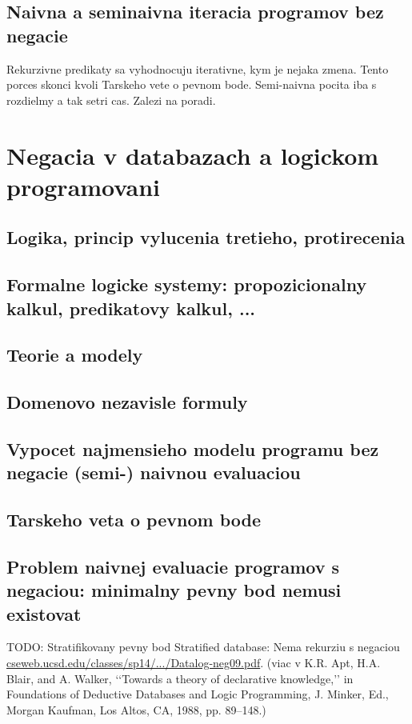 \documentclass[12pt,a4paper]{article}
\begin{document}
\subsection{Naivna a seminaivna iteracia programov bez negacie}
Rekurzivne predikaty sa vyhodnocuju iterativne, kym je nejaka zmena. Tento porces skonci kvoli Tarskeho vete o pevnom bode. Semi-naivna pocita iba s rozdielmy a tak setri cas. Zalezi na poradi. 

\section{Negacia v databazach a logickom programovani}

\subsection{Logika, princip vylucenia tretieho, protirecenia}

\subsection{Formalne logicke systemy: propozicionalny kalkul, predikatovy kalkul, ...}

\subsection{Teorie a modely}

\subsection{Domenovo nezavisle formuly}

\subsection{Vypocet najmensieho modelu programu bez negacie (semi-) naivnou evaluaciou}

\subsection{Tarskeho veta o pevnom bode}

\subsection{Problem naivnej evaluacie programov s negaciou: minimalny pevny bod nemusi existovat}

TODO: Stratifikovany pevny bod
Stratified database: Nema rekurziu s negaciou \url{cseweb.ucsd.edu/classes/sp14/.../Datalog-neg09.pdf}.
(viac v K.R. Apt, H.A. Blair, and A. Walker, ‘‘Towards a theory of declarative knowledge,’’ in Foundations of Deductive Databases and Logic Programming, J. Minker, Ed., Morgan Kaufman, Los Altos, CA, 1988, pp. 89–148.)
\end{document}
